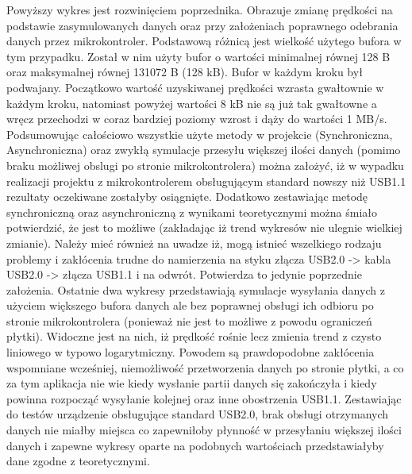 \documentclass{BscUS}
\begin{document}
\noindent Powyższy wykres jest rozwinięciem poprzednika. Obrazuje zmianę prędkości na podstawie zasymulowanych danych oraz przy założeniach poprawnego odebrania danych przez mikrokontroler. Podstawową różnicą jest wielkość użytego bufora w tym przypadku. Został w nim użyty bufor o wartości minimalnej równej 128 B oraz maksymalnej równej 131072 B (128 kB). Bufor w każdym kroku był podwajany. Początkowo wartość uzyskiwanej prędkości wzrasta gwałtownie w każdym kroku, natomiast powyżej wartości 8 kB nie są już tak gwałtowne a wręcz przechodzi w coraz bardziej poziomy wzrost i dąży do wartości 1 MB/s. 
\newline
\indent Podsumowując całościowo wszystkie użyte metody w projekcie (Synchroniczna, Asynchroniczna) oraz zwykłą symulacje przesyłu większej ilości danych (pomimo braku możliwej obslugi po stronie mikrokontrolera) można założyć, iż w wypadku realizacji projektu z mikrokontrolerem obsługującym standard nowszy niż USB1.1 rezultaty oczekiwane zostałyby osiągnięte. Dodatkowo zestawiając metodę synchroniczną oraz asynchroniczną z wynikami teoretycznymi można śmiało potwierdzić, że jest to możliwe (zakładając iż trend wykresów nie ulegnie wielkiej zmianie). Należy mieć również na uwadze iż, mogą istnieć wszelkiego rodzaju problemy i zakłócenia trudne do namierzenia na styku złącza USB2.0 -> kabla USB2.0 -> złącza USB1.1 i na odwrót. Potwierdza to jedynie poprzednie założenia. Ostatnie dwa wykresy przedstawiają symulacje wysyłania danych z użyciem większego bufora danych ale bez poprawnej obsługi ich odbioru po stronie mikrokontrolera (ponieważ nie jest to możliwe z powodu ograniczeń płytki). Widoczne jest na nich, iż prędkość rośnie lecz zmienia trend z czysto liniowego w typowo logarytmiczny. Powodem są prawdopodobne zakłócenia wspomniane wcześniej, niemożliwość przetworzenia danych po stronie płytki, a co za tym aplikacja nie wie kiedy wysłanie partii danych się zakończyła i kiedy powinna rozpocząć wysyłanie kolejnej oraz inne obostrzenia USB1.1. Zestawiając do testów urządzenie obsługujące standard USB2.0, brak obsługi otrzymanych danych nie miałby miejsca co zapewniłoby płynność w przesyłaniu większej ilości danych i zapewne wykresy oparte na podobnych wartościach przedstawiałyby dane zgodne z teoretycznymi.

\end{document}
